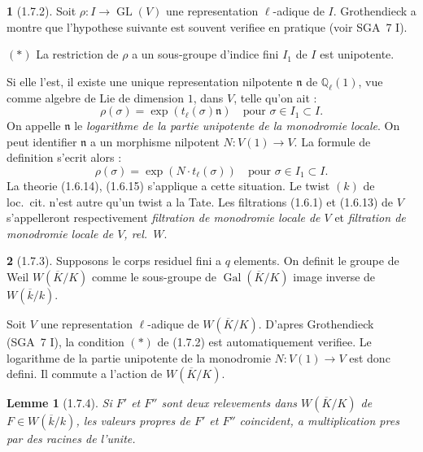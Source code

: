 \documentclass[12pt,a4paper]{article}
\theoremstyle{plain}
\newtheorem{lemme}[theorem]{Lemme}
\theoremstyle{definition}
\theoremstyle{definition}
\newtheorem{para}{}[section]
\theoremstyle{remark}
\DeclareMathOperator{\Gal}{Gal}
\DeclareMathOperator{\GL}{GL}
\begin{document}
\begin{para}[1.7.2]
Soit $\rho: I \to \GL(V)$ une representation $\ell$-adique de $I$. Grothendieck a montre que l'hypothese suivante est souvent verifiee en pratique (voir SGA~7 I).

$(*)$ La restriction de $\rho$ a un sous-groupe d'indice fini $I_1$ de $I$ est unipotente.

Si elle l'est, il existe une unique representation nilpotente $\mathfrak{n}$ de $\mathbb{Q}_\ell(1)$, vue comme algebre de Lie de dimension $1$, dans $V$, telle qu'on ait :
\begin{equation}\tag{1.7.2.1}
\rho(\sigma) = \exp(t_\ell(\sigma) \mathfrak{n}) \quad \text{pour } \sigma \in I_1 \subset I.
\end{equation}
On appelle $\mathfrak{n}$ le \emph{logarithme de la partie unipotente de la monodromie locale}. On peut identifier $\mathfrak{n}$ a un morphisme nilpotent $N: V(1) \to V$.
La formule de definition s'ecrit alors :
\begin{equation}\tag{1.7.2.2}
\rho(\sigma) = \exp(N \cdot t_\ell(\sigma)) \quad \text{pour } \sigma \in I_1 \subset I.
\end{equation}
La theorie (1.6.14), (1.6.15) s'applique a cette situation. Le twist $(k)$ de loc.~cit. n'est autre qu'un twist a la Tate. Les filtrations (1.6.1) et (1.6.13) de $V$ s'appelleront respectivement \emph{filtration de monodromie locale de $V$} et \emph{filtration de monodromie locale de $V$, rel.~$W$}.
\end{para}

\begin{para}[1.7.3]
Supposons le corps residuel fini a $q$ elements. On definit le groupe de Weil $W(\overline{K}/K)$ comme le sous-groupe de $\Gal(\overline{K}/K)$ image inverse de $W(\overline{k}/k)$.

Soit $V$ une representation $\ell$-adique de $W(\overline{K}/K)$. D'apres Grothendieck (SGA~7 I), la condition $(*)$ de (1.7.2) est automatiquement verifiee. Le logarithme de la partie unipotente de la monodromie $N: V(1) \to V$ est donc defini. Il commute a l'action de $W(\overline{K}/K)$.
\end{para}

\begin{lemme}[1.7.4]
Si $F'$ et $F''$ sont deux relevements dans $W(\overline{K}/K)$ de $F \in W(\overline{k}/k)$, les valeurs propres de $F'$ et $F''$ coincident, a multiplication pres par des racines de l'unite.
\end{lemme}
\end{document}
